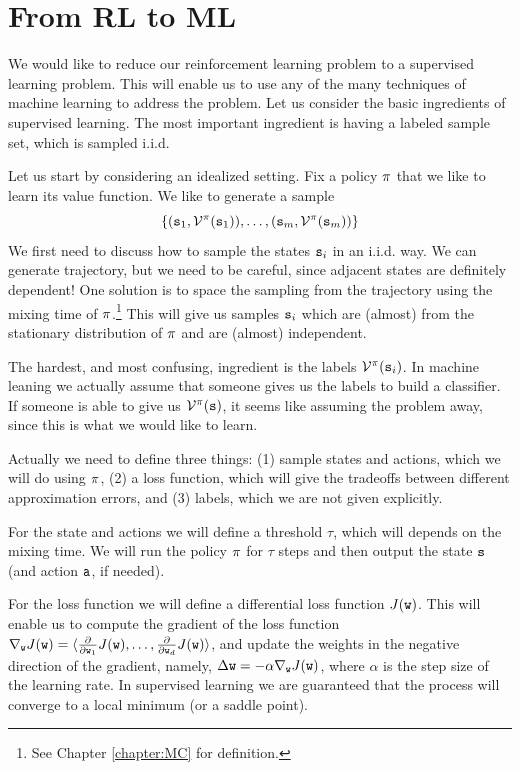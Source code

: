 \section{From RL to ML}

We would like to reduce our reinforcement learning problem to a
supervised learning problem. This will enable us to use any of the
many techniques of machine learning to address the problem. Let us
consider the basic ingredients of supervised learning. The most
important ingredient is having a labeled sample set, which is
sampled i.i.d.

Let us start by considering an idealized setting. Fix a policy
$\pi$ that we like to learn its value function. We like to
generate a sample
\[
\{({\tt s}_1, \mathcal{V}^\pi({\tt s}_1)),\ldots,
({\tt s}_m,\mathcal{V}^\pi({\tt s}_m))\}
\]
We first need to discuss how to sample the states ${\tt s}_i$ in an
i.i.d. way. We can generate trajectory, but we need to be careful,
since adjacent states are definitely dependent! One solution is to
space the sampling from the trajectory using the mixing time of
$\pi$.\footnote{See Chapter \ref{chapter:MC} for definition.}
This will give us samples ${\tt s}_i$ which are (almost) from the
stationary distribution of $\pi$ and are (almost) independent.

The hardest, and most confusing, ingredient is the labels
$\mathcal{V}^\pi({\tt s}_i)$. In machine leaning we actually assume
that someone gives us the labels to build a classifier.
If someone is able to give us
$\mathcal{V}^\pi({\tt s})$, it seems like assuming the problem away,
since this is what we would like to learn.

Actually we need to define three things: (1) sample states and actions,
which we will do using $\pi$, (2) a loss function, which will
give the tradeoffs between different approximation errors, and (3)
labels, which we are not given explicitly.

For the state and actions we will define a threshold $\tau$, which
will depends on the mixing time. We will run the policy $\pi$
for $\tau$ steps and then output the state ${\tt s}$ (and action
${\tt a}$, if needed).

For the loss function we will define a differential loss function
$J({\tt w})$. This will enable us to compute the gradient of the
loss function $\nabla_{\tt w}
J({\tt w})=\langle\frac{\partial}{\partial {\tt w}_1}J({\tt w}),
\ldots , \frac{\partial}{\partial {\tt w}_d}J({\tt w})\rangle$, and
update the weights in the negative direction of the gradient,
namely, $\Delta {\tt w}=-\alpha\nabla_{\tt w} J({\tt w})$, where
$\alpha$ is the step size of the learning rate. In supervised
learning we are guaranteed that the process will converge to a local
minimum (or a saddle point).


